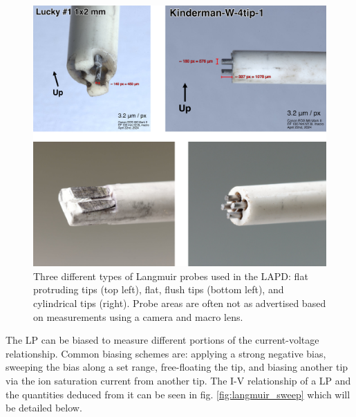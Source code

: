 \begin{figure}
	\centering
	\includegraphics[width=\textwidth]{figures/langmuir_pics.jpg}
	\caption[Images of Langmuir probes used in the LAPD]{\label{fig:langmuir_tips}Three different types of Langmuir probes used in the LAPD: flat protruding tips (top left), flat, flush tips (bottom left), and cylindrical tips (right). Probe areas are often not as advertised based on measurements using a camera and macro lens.}
\end{figure}

The LP can be biased to measure different portions of the current-voltage relationship. Common biasing schemes are: applying a strong negative bias, sweeping the bias along a set range, free-floating the tip, and biasing another tip via the ion saturation current  from another tip. The I-V relationship of a LP and the quantities deduced from it can be seen in fig. \ref{fig:langmuir_sweep} which will be detailed below.

